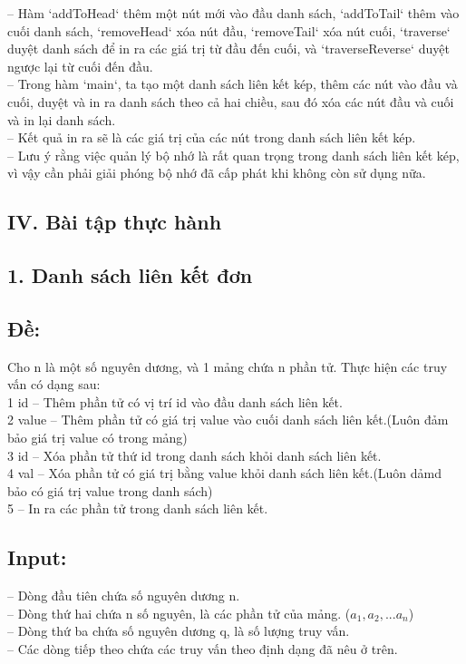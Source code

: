 -- Hàm `addToHead` thêm một nút mới vào đầu danh sách, `addToTail` thêm vào cuối danh sách, `removeHead` xóa nút đầu, `removeTail` xóa nút cuối, `traverse` duyệt danh sách để in ra các giá trị từ đầu đến cuối, và `traverseReverse` duyệt ngược lại từ cuối đến đầu.\\
-- Trong hàm `main`, ta tạo một danh sách liên kết kép, thêm các nút vào đầu và cuối, duyệt và in ra danh sách theo cả hai chiều, sau đó xóa các nút đầu và cuối và in lại danh sách.\\
-- Kết quả in ra sẽ là các giá trị của các nút trong danh sách liên kết kép.\\
-- Lưu ý rằng việc quản lý bộ nhớ là rất quan trọng trong danh sách liên kết kép, vì vậy cần phải giải phóng bộ nhớ đã cấp phát khi không còn sử dụng nữa.
\subsection*{IV. Bài tập thực hành}
\subsection*{1. Danh sách liên kết đơn}
\subsection*{Đề:}
Cho n là một số nguyên dương, và 1 mảng chứa n phần tử. Thực hiện các truy vấn có dạng sau:\\
1 id -- Thêm phần tử có vị trí id vào đầu danh sách liên kết.\\
2 value -- Thêm phần tử có giá trị value vào cuối danh sách liên kết.(Luôn đảm bảo giá trị value có trong mảng)\\
3 id -- Xóa phần tử thứ id trong danh sách khỏi danh sách liên kết.\\
4 val -- Xóa phần tử có giá trị bằng value khỏi danh sách liên kết.(Luôn dảmd bảo có giá trị value trong danh sách)\\
5 -- In ra các phần tử trong danh sách liên kết.
\vspace{-1.em}
\subsection*{Input:}
-- Dòng đầu tiên chứa số nguyên dương n.\\
-- Dòng thứ hai chứa n số nguyên, là các phần tử của mảng. ($a_{1}, a_{2}, ... a_{n}$)\\
-- Dòng thứ ba chứa số nguyên dương q, là số lượng truy vấn.\\
-- Các dòng tiếp theo chứa các truy vấn theo định dạng đã nêu ở trên.
\vspace{-1.em}
